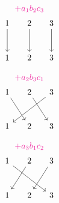 \documentclass[../../../topic_linear-algebra]{subfiles}
\begin{document}
\begin{tcbraster}[raster columns=3]
  \begin{tcolorbox}[empty]
    \begin{equation*}
      \begin{gathered}
        \textcolor{Rhodamine}{+a_1b_2c_3} \\
        \begin{tikzcd}[column sep=3ex, row sep=large]
          1\arrow[d] & 2\arrow[d] & 3\arrow[d] \\
          1 & 2 & 3
        \end{tikzcd}
      \end{gathered}
    \end{equation*}
  \end{tcolorbox}
  \begin{tcolorbox}[empty]
    \begin{equation*}
      \begin{gathered}
        \textcolor{Rhodamine}{+a_2b_3c_1} \\
        \begin{tikzcd}[column sep=3ex, row sep=large]
          1\arrow[rd] & 2\arrow[rd] & 3\arrow[lld] \\
          1 & 2 & 3
        \end{tikzcd}
      \end{gathered}
    \end{equation*}
  \end{tcolorbox}
  \begin{tcolorbox}[empty]
    \begin{equation*}
      \begin{gathered}
        \textcolor{Rhodamine}{+a_3b_1c_2} \\
        \begin{tikzcd}[column sep=3ex, row sep=large]
          1\arrow[rrd] & 2\arrow[ld] & 3\arrow[ld] \\
          1 & 2 & 3
        \end{tikzcd}
      \end{gathered}
    \end{equation*}
  \end{tcolorbox}
  \begin{tcolorbox}[empty]
    \begin{equation*}
      \begin{gathered}

\end{gathered}
\end{equation*}
\end{tcolorbox}
\end{tcbraster}
\end{document}
